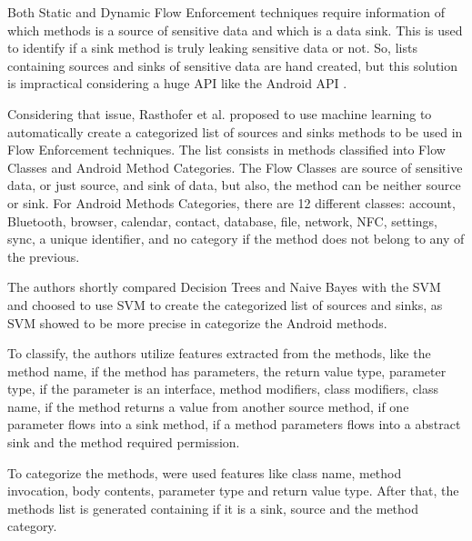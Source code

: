 Both Static and Dynamic Flow Enforcement techniques require information of which methods is a source of sensitive 
data and which is a data sink. This is used to identify if a sink method is truly leaking sensitive data or not. So,
lists containing sources and sinks of sensitive data are hand created, but this solution is impractical considering 
a huge API like the Android API \cite{rasthofer2014machine}.

Considering that issue, Rasthofer et al. \cite{rasthofer2014machine} proposed to use machine learning to 
automatically create a categorized list of sources and sinks methods to be used in Flow Enforcement techniques.
The list consists in methods classified into Flow Classes and Android Method Categories. The Flow Classes are 
source of sensitive data, or just source, and sink of data, but also, the method can be neither source or sink. For 
Android Methods Categories, there are 12 different classes: account, Bluetooth, browser, calendar, contact, 
database, file, network, NFC, settings, sync, a unique identifier, and no category if the method does not belong to 
any of the previous.

The authors shortly compared Decision Trees and Naive Bayes with the SVM and choosed to use SVM to create the 
categorized list of sources and sinks, as SVM showed to be more precise in categorize the Android methods. 

To classify, the authors utilize features extracted from the methods, like the method name, if the method has 
parameters, the return value type, parameter type, if the parameter is an interface, method modifiers, class 
modifiers, class name, if the method returns a value from another source method, if one parameter flows into a sink 
method, if a method parameters flows into a abstract sink and the method required permission. 

To categorize the methods, were used features like class name, method invocation, body contents, parameter type and 
return value type. After that, the methods list is generated containing if it is a sink, source and the method 
category.
